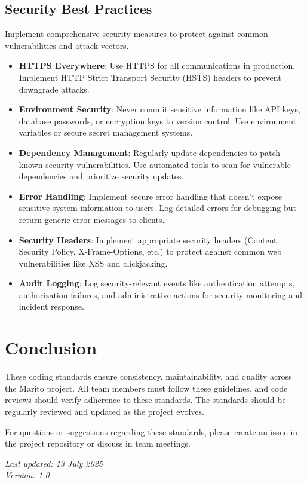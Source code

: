 \documentclass[12pt]{article}
\begin{document}
\subsection{Security Best Practices}
Implement comprehensive security measures to protect against common vulnerabilities and attack vectors.

\begin{itemize}
    \item \textbf{HTTPS Everywhere}: Use HTTPS for all communications in production. Implement HTTP Strict Transport Security (HSTS) headers to prevent downgrade attacks.
    
    \item \textbf{Environment Security}: Never commit sensitive information like API keys, database passwords, or encryption keys to version control. Use environment variables or secure secret management systems.
    
    \item \textbf{Dependency Management}: Regularly update dependencies to patch known security vulnerabilities. Use automated tools to scan for vulnerable dependencies and prioritize security updates.
    
    \item \textbf{Error Handling}: Implement secure error handling that doesn't expose sensitive system information to users. Log detailed errors for debugging but return generic error messages to clients.
    
    \item \textbf{Security Headers}: Implement appropriate security headers (Content Security Policy, X-Frame-Options, etc.) to protect against common web vulnerabilities like XSS and clickjacking.
    
    \item \textbf{Audit Logging}: Log security-relevant events like authentication attempts, authorization failures, and administrative actions for security monitoring and incident response.
\end{itemize}

\section{Conclusion}
These coding standards ensure consistency, maintainability, and quality across the Marito project. All team members must follow these guidelines, and code reviews should verify adherence to these standards. The standards should be regularly reviewed and updated as the project evolves.

For questions or suggestions regarding these standards, please create an issue in the project repository or discuss in team meetings.

\vspace{1cm}
\begin{flushright}
\textit{Last updated: 13 July 2025}\\
\textit{Version: 1.0}
\end{flushright}
\end{document}
